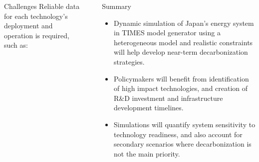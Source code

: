 \documentclass[final]{beamer}
\newlength{\sepwid}
\newlength{\onecolwid}
\newlength{\threecolwid}
\begin{document}
\begin{frame}[t]
\begin{columns}[t,totalwidth=\threecolwid]
\begin{column}{\onecolwid}
\begin{block}{Challenges}
   Reliable data for each technology's deployment and operation is required, such as:
 
 	
\end{block}



\end{column} %

\begin{column}{\sepwid}\end{column} %

\begin{column}{\onecolwid} %


\begin{block}{Summary}
\begin{itemize}

\item Dynamic simulation of Japan's energy system in TIMES model generator using a heterogeneous model and realistic constraints will help develop near-term decarbonization strategies.

\item Policymakers will benefit from identification of high impact technologies, and creation of R\&D investment and infrastructure development timelines.

\item Simulations will quantify system sensitivity to technology readiness, and also account for secondary scenarios where decarbonization is not the main priority.

\end{itemize}

\end{block}




\end{column}
\end{columns}
\end{frame}
\end{document}
